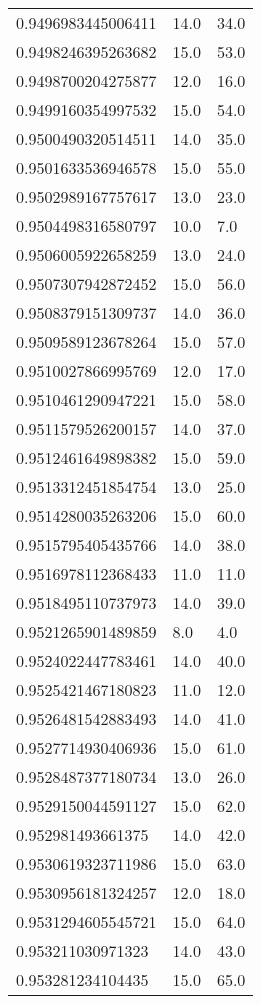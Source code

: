 \begin{center}
\begin{supertabular}[H]{p{0.30\textwidth}p{0.05\textwidth}p{0.05\textwidth}}
0.9496983445006411 & 14.0 & 34.0 \\ 
0.9498246395263682 & 15.0 & 53.0 \\ 
0.9498700204275877 & 12.0 & 16.0 \\ 
0.9499160354997532 & 15.0 & 54.0 \\ 
0.9500490320514511 & 14.0 & 35.0 \\ 
0.9501633536946578 & 15.0 & 55.0 \\ 
0.9502989167757617 & 13.0 & 23.0 \\ 
0.9504498316580797 & 10.0 & 7.0 \\ 
0.9506005922658259 & 13.0 & 24.0 \\ 
0.9507307942872452 & 15.0 & 56.0 \\ 
0.9508379151309737 & 14.0 & 36.0 \\ 
0.9509589123678264 & 15.0 & 57.0 \\ 
0.9510027866995769 & 12.0 & 17.0 \\ 
0.9510461290947221 & 15.0 & 58.0 \\ 
0.9511579526200157 & 14.0 & 37.0 \\ 
0.9512461649898382 & 15.0 & 59.0 \\ 
0.9513312451854754 & 13.0 & 25.0 \\ 
0.9514280035263206 & 15.0 & 60.0 \\ 
0.9515795405435766 & 14.0 & 38.0 \\ 
0.9516978112368433 & 11.0 & 11.0 \\ 
0.9518495110737973 & 14.0 & 39.0 \\ 
0.9521265901489859 & 8.0 & 4.0 \\ 
0.9524022447783461 & 14.0 & 40.0 \\ 
0.9525421467180823 & 11.0 & 12.0 \\ 
0.9526481542883493 & 14.0 & 41.0 \\ 
0.9527714930406936 & 15.0 & 61.0 \\ 
0.9528487377180734 & 13.0 & 26.0 \\ 
0.9529150044591127 & 15.0 & 62.0 \\ 
0.952981493661375 & 14.0 & 42.0 \\ 
0.9530619323711986 & 15.0 & 63.0 \\ 
0.9530956181324257 & 12.0 & 18.0 \\ 
0.9531294605545721 & 15.0 & 64.0 \\ 
0.953211030971323 & 14.0 & 43.0 \\ 
0.953281234104435 & 15.0 & 65.0 \\ 

\end{supertabular}
\end{center}
